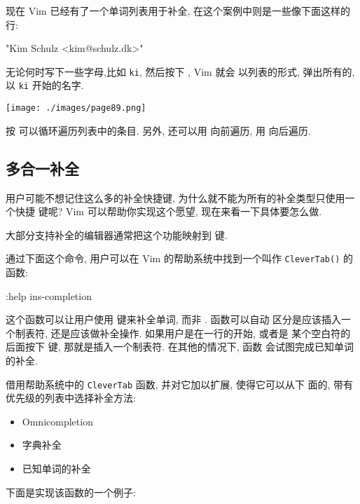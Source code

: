 现在 Vim 已经有了一个单词列表用于补全, 在这个案例中则是一些像下面这样的行:
\begin{vimcode}
"Kim Schulz <kim@schulz.dk>"
\end{vimcode}
无论何时写下一些字母,比如 \texttt{ki}, 然后按下 , Vim 就会
以列表的形式, 弹出所有的, 以 \texttt{ki} 开始的名字.
\begin{center}
    \texttt{[image: ./images/page89.png]}
\end{center}
按  可以循环遍历列表中的条目. 另外, 还可以用  向前遍历,
用  向后遍历.

\subsection{多合一补全}
\label{subsec:all_in_one_completion}

用户可能不想记住这么多的补全快捷键, 为什么就不能为所有的补全类型只使用一个快捷
键呢? Vim 可以帮助你实现这个愿望, 现在来看一下具体要怎么做.

大部分支持补全的编辑器通常把这个功能映射到  键.

通过下面这个命令, 用户可以在 Vim 的帮助系统中找到一个叫作
\texttt{CleverTab()} 的函数:
\begin{vimcode}
:help ins-completion
\end{vimcode}
这个函数可以让用户使用  键来补全单词, 而非 . 函数可以自动
区分是应该插入一个制表符, 还是应该做补全操作. 如果用户是在一行的开始, 或者是
某个空白符的后面按下  键, 那就是插入一个制表符. 在其他的情况下, 函数
会试图完成已知单词的补全.

借用帮助系统中的 \texttt{CleverTab} 函数, 并对它加以扩展, 使得它可以从下
面的, 带有优先级的列表中选择补全方法:
\begin{itemize}
    \item Omnicompletion
    \item 字典补全
    \item 已知单词的补全
\end{itemize}
下面是实现该函数的一个例子:

